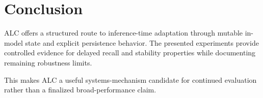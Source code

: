 \section{Conclusion}
ALC offers a structured route to inference-time adaptation through mutable in-model state and explicit persistence behavior. The presented experiments provide controlled evidence for delayed recall and stability properties while documenting remaining robustness limits.

This makes ALC a useful systems-mechanism candidate for continued evaluation rather than a finalized broad-performance claim.

